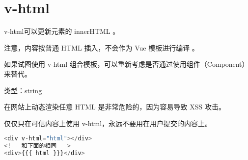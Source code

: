\chapter{v-html}

v-html可以更新元素的 innerHTML 。

注意，内容按普通 HTML 插入，不会作为 Vue 模板进行编译 。

如果试图使用 v-html 组合模板，可以重新考虑是否通过使用组件（Component）来替代。

\begin{compactitem}
\item 类型：string
\end{compactitem}

在网站上动态渲染任意 HTML 是非常危险的，因为容易导致 XSS 攻击。

仅仅只在可信内容上使用 v-html，永远不要用在用户提交的内容上。


\begin{lstlisting}[language=JavaScript]
<div v-html="html"></div>
<!-- 和下面的相同 -->
<div>{{{ html }}}</div>
\end{lstlisting}



\begin{lstlisting}[language=JavaScript]

\end{lstlisting}




\begin{lstlisting}[language=JavaScript]

\end{lstlisting}




\begin{lstlisting}[language=JavaScript]

\end{lstlisting}




\begin{lstlisting}[language=JavaScript]

\end{lstlisting}




\begin{lstlisting}[language=JavaScript]

\end{lstlisting}




\begin{lstlisting}[language=JavaScript]

\end{lstlisting}




